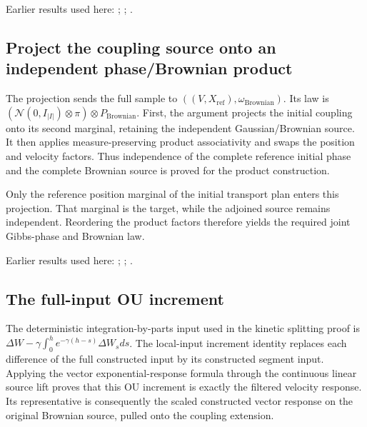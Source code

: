 \documentclass[11pt,a4paper]{report}
\begin{document}
Earlier results used here: \cite[Section~3.13.2]{LangevinLean2026ULASC}; \cite[Section~3.13.5]{LangevinLean2026ULASC}; \cite[Section~3.17.1]{LangevinLean2026ULASC}.
\subsection{\texorpdfstring{Project the coupling source onto an independent phase/\allowbreak{}Brownian product}{Project the coupling source onto an independent phase/Brownian product}}
\label{report-step-KineticLangevin-GenericCanonicalKLMC-lean-11}


The projection sends the full sample to \(((V,X_\mathrm{ref}),\omega_\mathrm{Brownian})\). Its law is \((\mathcal N(0,I_{|I|})\otimes\pi)\otimes P_\mathrm{Brownian}\). First, the argument projects the initial coupling onto its second marginal, retaining the independent Gaussian/\allowbreak{}Brownian source. It then applies measure-preserving product associativity and swaps the position and velocity factors. Thus independence of the complete reference initial phase and the complete Brownian source is proved for the product construction.



Only the reference position marginal of the initial transport plan enters this projection. That marginal is the target, while the adjoined source remains independent. Reordering the product factors therefore yields the required joint Gibbs-phase and Brownian law.



Earlier results used here: \cite[Section~3.17.1]{LangevinLean2026ULASC}; \cite[Section~3.8.16]{LangevinLean2026ULASC}; \cite[Section~3.8.17]{LangevinLean2026ULASC}.
\subsection{\texorpdfstring{The full-input OU increment}{The full-input OU increment}}
\label{report-step-KineticLangevin-GenericCanonicalKLMC-lean-12}


The deterministic integration-by-parts input used in the kinetic splitting proof is \(\Delta W-\gamma\int_0^he^{-\gamma(h-s)}\Delta W_sds\). The local-input increment identity replaces each difference of the full constructed input by its constructed segment input. Applying the vector exponential-response formula through the continuous linear source lift proves that this OU increment is exactly the filtered velocity response. Its representative is consequently the scaled constructed vector response on the original Brownian source, pulled onto the coupling extension.
\end{document}

